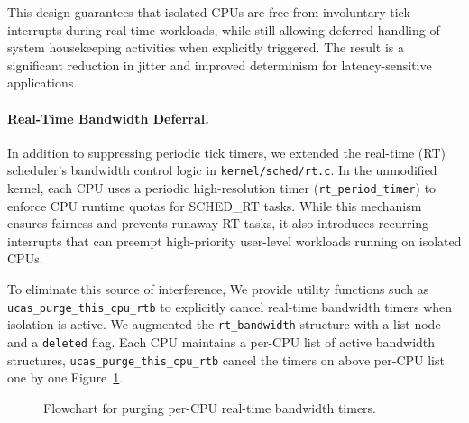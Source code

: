 \documentclass[letterpaper]{article}
\begin{document}
This design guarantees that isolated CPUs are free from involuntary tick 
interrupts during real-time workloads, while still allowing deferred handling 
of system housekeeping activities when explicitly triggered. The result is a 
significant reduction in jitter and improved determinism for 
latency-sensitive applications.

\paragraph{Real-Time Bandwidth Deferral.}
In addition to suppressing periodic tick timers, we extended the real-time (RT) 
scheduler’s bandwidth control logic in \texttt{kernel/sched/rt.c}. In the 
unmodified kernel, each CPU uses a periodic high-resolution timer 
(\texttt{rt\_period\_timer}) to enforce CPU runtime quotas for SCHED\_RT tasks. 
While this mechanism ensures fairness and prevents runaway RT tasks, it also 
introduces recurring interrupts that can preempt high-priority user-level 
workloads running on isolated CPUs.

To eliminate this source of interference, 
We provide utility functions such as 
\texttt{ucas\_purge\_this\_cpu\_rtb} to explicitly cancel real-time bandwidth timers when 
isolation is active. We augmented the \texttt{rt\_bandwidth} 
structure with a list node and a \texttt{deleted} flag. Each CPU maintains a 
per-CPU list of active bandwidth structures, \texttt{ucas\_purge\_this\_cpu\_rtb} cancel
the timers on above per-CPU list one by one Figure~\ref{fig:purge_flowchart}.

\begin{figure}[t]
\centering
{}
\caption{Flowchart for purging per-CPU real-time bandwidth timers.}
\label{fig:purge_flowchart}
\end{figure}
\end{document}
